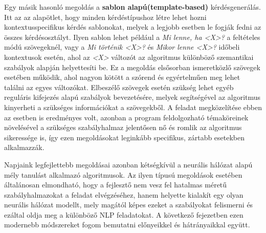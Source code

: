 Egy másik hasonló megoldás a \textbf{sablon alapú(template-based)} kérdésgenerálás. Itt az az alapötlet, hogy minden kérdéstípushoz létre lehet hozni kontextusspecifikus kérdés sablonokat, melyek a legjobb esetben le fogják fedni az összes kérdésosztályt. Ilyen sablon lehet például a \textit{Mi lenne, ha <X>?} a feltételes módú szövegeknél, vagy a \textit{Mi történik <X>?} és \textit{Mikor lenne <X>?} időbeli kontextusok esetén, ahol az \textit{<X>} változót az algoritmus különböző szemantikai szabályok alapján helyettesíti be. Ez a megoldás elsősorban ismeretközlő szövegek esetében működik, ahol nagyon kötött a szórend és egyértelműen meg lehet találni az egyes változókat. Elbeszélő szövegek esetén szükség lehet egyéb reguláris kifejezés alapú szabályok bevezetésére, melyek segítségével az algoritmus kinyerheti a szükséges információkat a szövegekből. A feladat megközelítése ebben az esetben is eredményes volt, azonban a program feldolgozható témaköreinek növelésével a szükséges szabályhalmaz jelentősen nő és romlik az algoritmus sikeressége is, így ezen megoldásokat leginkább specifikus, zártabb esetekben alkalmazzák.

Napjaink legfejlettebb megoldásai azonban kétségkívül a neurális hálózat alapú mély tanulást alkalmazó algoritmusok. Az ilyen típusú megoldások esetében általánosan elmondható, hogy a fejlesztő nem vesz fel hatalmas méretű szabályhalmazokat a feladat elvégzéséhez, hanem helyette kialakít egy olyan neurális hálózat modellt, mely magától képes ezeket a szabályokat felismerni és ezáltal oldja meg a különböző NLP feladatokat. A következő fejezetben ezen modernebb módszereket fogom bemutatni előnyeikkel és hátrányaikkal együtt.


